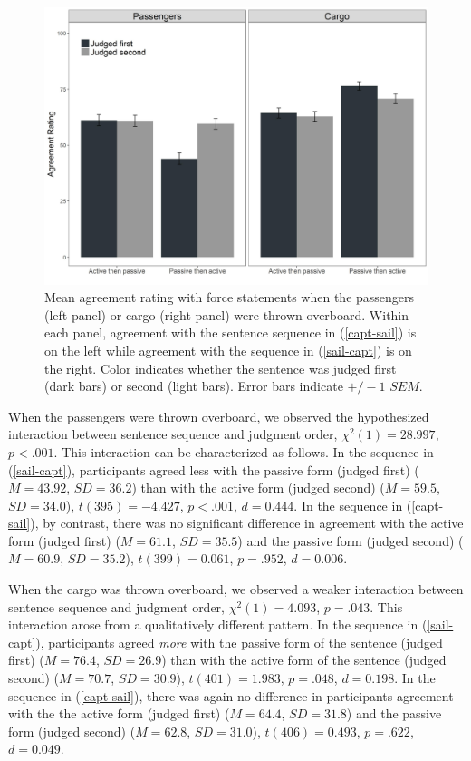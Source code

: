 \documentclass{salt}
\newcommand{\reff}[1]{(\ref{#1})}
\begin{document}
\begin{figure}[ht]
	\includegraphics[width=1\linewidth]{Fig1} 
	\caption{\small Mean agreement rating with force statements when the passengers (left panel) or cargo (right panel) were thrown overboard. Within each panel, agreement with the sentence sequence in \reff{capt-sail} is on the left while agreement with the sequence in \reff{sail-capt} is on the right. Color indicates whether the sentence was judged first (dark bars) or second (light bars). Error bars indicate $+/-1$ $SEM$.}\label{Fig1}
\end{figure}

When the passengers were thrown overboard, we observed the hypothesized interaction between sentence sequence and judgment order, $\chi^2(1)=28.997$, $p<.001$. This interaction can be characterized as follows. In the sequence in \reff{sail-capt}, participants agreed less with the passive form (judged first) ($M=43.92$, $SD=36.2$) than with the active form (judged second) ($M=59.5$, $SD=34.0$), $t(395) = -4.427$, $p<.001$, $d=0.444$. In the sequence in \reff{capt-sail}, by contrast, there was no significant difference in agreement with the active form (judged first) ($M=61.1$, $SD=35.5$) and the passive form (judged second) ($M=60.9$, $SD=35.2$), $t(399) = 0.061$, $p=.952$, $d=0.006$.

When the cargo was thrown overboard, we observed a weaker interaction between sentence sequence and judgment order, $\chi^2(1)=4.093$, $p=.043$. This interaction arose from a qualitatively different pattern. In the sequence in \reff{sail-capt}, participants agreed \textit{more} with the passive form of the sentence (judged first) ($M=76.4$, $SD=26.9$) than with the active form of the sentence (judged second) ($M=70.7$, $SD=30.9$), $t(401) = 1.983$, $p=.048$, $d=0.198$. In the sequence in \reff{capt-sail}, there was again no difference in participants agreement with the the active form (judged first) ($M=64.4$, $SD=31.8$) and the passive form (judged second) ($M=62.8$, $SD=31.0$), $t(406) = 0.493$, $p=.622$, $d=0.049$.
\end{document}
